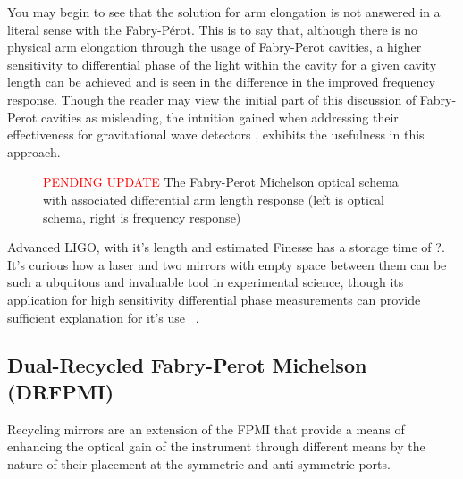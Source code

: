 You may begin to see that the solution for arm elongation is not answered in a literal sense with the Fabry-P\'{e}rot. This is to say that, although there is no physical arm elongation through the usage of Fabry-Perot cavities, a higher sensitivity to differential phase of the light within the cavity for a given cavity length can be achieved and is seen in the difference in the improved frequency response. Though the reader may view the initial part of this discussion of Fabry-Perot cavities as misleading, the intuition gained when addressing their effectiveness for gravitational wave detectors \cite{saulson97}, exhibits the usefulness in this approach.

\begin{figure}[h!]
	\begin{subfigure}{\texttt{[image: INTRO/tempsub\_Basic\_michelson\_with\_FP\_labeled.jpg]}}
  \end{subfigure}
  \hfill
  \begin{subfigure}{\texttt{[image: mich\_fr.pdf]}}%
  \end{subfigure}
  \hfill
  \caption{\textcolor{red}{PENDING UPDATE} The Fabry-Perot Michelson optical schema with associated differential arm length response (left is optical schema, right is frequency response)}
  \label{fig:fpmi}
\end{figure}

Advanced LIGO, with it's length and estimated Finesse has a storage time of ?.
It's curious how a laser and two mirrors with empty space between them can be such a ubquitous and invaluable tool in experimental science, though its application for high sensitivity differential phase measurements can provide sufficient explanation for it's use ~\cite{?}. 

\subsection{Dual-Recycled Fabry-Perot Michelson (DRFPMI)}
Recycling mirrors are an extension of the FPMI that provide a means of enhancing the optical gain of the instrument through different means by the nature of their placement at the symmetric and anti-symmetric ports.

